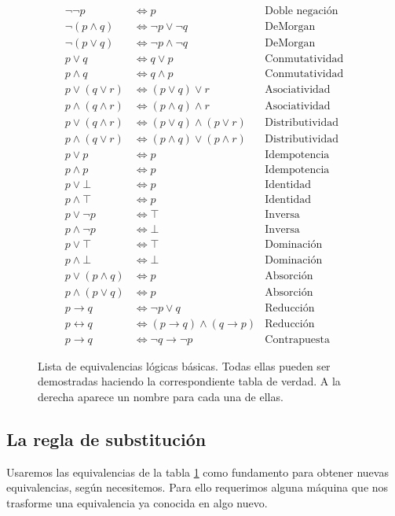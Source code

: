 \documentclass{book}
\begin{document}
\begin{figure}[h]
\label{tb_EquivalenciasLogicas}
\begin{align*}
	\neg \neg p &\iff p & \text{Doble negación}\\
	\neg(p \wedge q) &\iff \neg p \vee \neg q & \text{DeMorgan}\\
	\neg(p \vee q) &\iff \neg p \wedge \neg q & \text{DeMorgan}\\
	p \vee q &\iff q \vee p & \text{Conmutatividad} \\
	p \wedge q & \iff q \wedge p & \text{Conmutatividad}\\
	p \vee (q \vee r) &\iff (p \vee q) \vee r & \text{Asociatividad}\\
	p \wedge (q \wedge r) &\iff (p \wedge q) \wedge r & \text{Asociatividad}\\
	p \vee (q \wedge r) &\iff (p \vee q) \wedge (p \vee r) & \text{Distributividad} \\
	p \wedge (q \vee r) &\iff (p \wedge q) \vee (p \wedge r) & \text{Distributividad}\\
	p \vee p &\iff p & \text{Idempotencia} \\
	p \wedge p &\iff p & \text{Idempotencia}\\
	p \vee \bot &\iff p & \text{Identidad} \\
	p \wedge \top &\iff p & \text{Identidad}\\
	p \vee \neg p &\iff \top & \text{Inversa}\\
	p \wedge \neg p &\iff \bot & \text{Inversa}\\
	p \vee \top &\iff \top & \text{Dominación} \\
	p \wedge \bot &\iff \bot & \text{Dominación} \\
	p \vee (p \wedge q) &\iff p & \text{Absorción} \\
	p \wedge (p \vee q) & \iff p & \text{Absorción}\\
	p \rightarrow q &\iff \neg p \vee q & \text{Reducción}\\
	p \leftrightarrow q &\iff (p \rightarrow q) \wedge (q \rightarrow p) & \text{Reducción}\\
	p \rightarrow q &\iff \neg q \rightarrow \neg p & \text{Contrapuesta}
\end{align*}
\caption{Lista de equivalencias lógicas básicas. Todas ellas pueden ser demostradas haciendo la correspondiente tabla de verdad. A la derecha aparece un nombre para cada una de ellas.}
\end{figure}

\subsection{La regla de substitución}
Usaremos las equivalencias de la tabla \ref{tb_EquivalenciasLogicas} como fundamento para obtener nuevas equivalencias, según necesitemos.
Para ello requerimos alguna máquina que nos trasforme una equivalencia ya conocida en algo nuevo.
\end{document}
